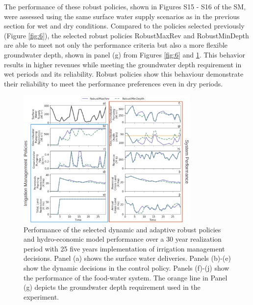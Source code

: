 \documentclass[a4paper,fleqn]{cas-sc}
\begin{document}
The performance of these robust policies, shown in Figures S15 - S16 of the SM, were assessed using the same surface water supply scenarios as in the previous section for wet and dry conditions. Compared to the policies selected previously (Figure \ref{fig:6}), the selected robust policies RobustMaxRev and RobustMinDepth are able to meet not only the performance criteria but also a more flexible groundwater depth, shown in panel (g) from Figures \ref{fig:6} and \ref{fig:8}. This behavior results in higher revenues while meeting the groundwater depth requirement in wet periods and its reliability. Robust policies show this behaviour demonstrate their reliability to meet the performance preferences even in dry periods.


\begin{figure}[htb!]
    \includegraphics[width=0.8\textwidth,center]{./figs/robust_highsd_performance.png}
    \caption{Performance of the selected dynamic and adaptive robust policies and hydro-economic model performance over a 30 year realization period with 25 five years implementation of irrigation management decisions. Panel (a) shows the surface water deliveries. Panels (b)-(e) show the dynamic decisions in the control policy. Panels (f)-(j) show the performance of the food-water system. The orange line in Panel (g) depicts the groundwater depth requirement used in the experiment.} \label{fig:8}
\end{figure}

\clearpage
\end{document}
